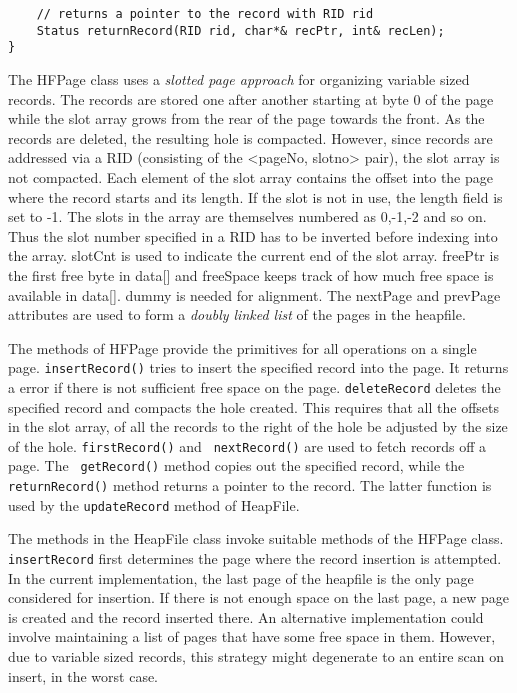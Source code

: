 {\begin{verbatim}
    // returns a pointer to the record with RID rid
    Status returnRecord(RID rid, char*& recPtr, int& recLen);
}

\end{verbatim}


The  HFPage  class uses a  {\em  slotted page approach} for organizing
variable  sized records.   The records  are stored   one after another
starting  at byte 0 of the  page while the  slot array  grows from the
rear of the page towards the  front.  As the  records are deleted, the
resulting hole is compacted.  However, since records are addressed via
a RID (consisting of the <pageNo, slotno> pair), the slot array is not
compacted. Each element of the slot array contains the offset into the
page where the  record starts and its length.   If the slot is  not in
use, the length  field is  set   to -1. The  slots  in  the array  are
themselves  numbered   as 0,-1,-2 and  so   on.  Thus the  slot number
specified in a    RID has to    be inverted before  indexing into  the
array. slotCnt is used to indicate the current end  of the slot array.
freePtr is the first free byte in  data[] and freeSpace keeps track of
how much  free space  is  available in data[].   dummy is   needed for
alignment.  The nextPage  and prevPage attributes  are used to  form a
{\em doubly linked list} of the pages in the heapfile.

The methods of HFPage provide the primitives for all operations on
a  single page.  {\tt insertRecord()} tries   to  insert the specified
record into the  page. It returns a error  if there is not  sufficient
free space on the    page. {\tt deleteRecord} deletes   the  specified
record  and compacts  the  hole created.  This  requires that all  the
offsets in the slot array, of all the records to the right of the hole
be adjusted by   the size of  the hole.  {\tt firstRecord()} and  {\tt
nextRecord()}  are   used  to fetch  records   off  a  page.  The {\tt
getRecord()} method copies out the   specified record, while the  {\tt
returnRecord()} method returns a   pointer to the record.  The  latter
function is used by the {\tt updateRecord} method of HeapFile.

The   methods in  the HeapFile class    invoke suitable methods of the
HFPage class. {\tt insertRecord}  first determines the page  where the
record insertion is attempted. In the current implementation, the last
page of the  heapfile is the  only page  considered  for insertion. If
there is not enough space on the last page, a  new page is created and
the record inserted there. An alternative implementation could involve
maintaining   a  list of     pages  that have  some   free   space  in
them.  However, due to  variable  sized  records, this strategy  might
degenerate to an entire scan on insert, in the worst case.

}
